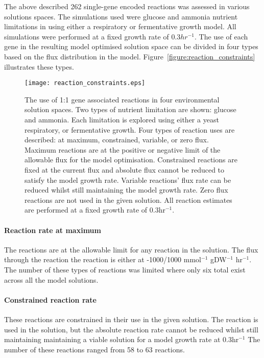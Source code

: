 The above described 262 single-gene encoded reactions was assessed in various solutions spaces. The simulations used were glucose and ammonia nutrient limitations in using either a respiratory or fermentative growth model. All simulations were performed at a fixed growth rate of 0.3$hr^{-1}$. The use of each gene in the resulting model optimised solution space can be divided in four types based on the flux distribution in the model. Figure~\vref{figure:reaction_constraints} illustrates these types.

\begin{figure}
\centering
\texttt{[image: reaction\_constraints.eps]}
\caption[Gene use in model optimised solution space]{The use of 1:1 gene associated reactions in four environmental solution spaces. Two types of nutrient limitation are shown: glucose and ammonia. Each limitation is explored using either a yeast respiratory, or fermentative growth. Four types of reaction uses are described: at maximum, constrained, variable, or zero flux. Maximum reactions are at the positive or negative limit of the allowable flux for the model optimisation. Constrained reactions are fixed at the current flux and absolute flux cannot be reduced to satisfy the model growth rate. Variable reactions' flux rate can be reduced whilst still maintaining the model growth rate. Zero flux reactions are not used in the given solution. All reaction estimates are performed at a fixed growth rate of 0.3hr$^{-1}$. }
\label{figure:reaction_constraints}
\end{figure}

\paragraph{Reaction rate at maximum}

The reactions are at the allowable limit for any reaction in the solution. The flux through the reaction the reaction is either at -1000/1000 mmol$^{-1}$ gDW$^{-1}$ hr$^{-1}$. The number of these types of reactions was limited where only six total exist across all the model solutions.

\paragraph{Constrained reaction rate}

These reactions are constrained in their use in the given solution. The reaction is used in the solution, but the absolute reaction rate cannot be reduced whilst still maintaining maintaining a viable solution for a model growth rate at 0.3hr$^{-1}$ The number of these reactions ranged from 58 to 63 reactions.

